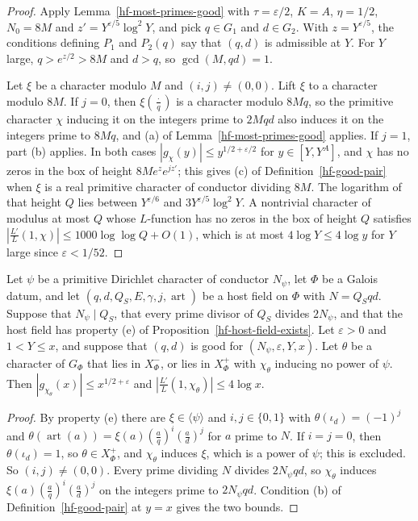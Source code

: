 \begin{proof}
Apply Lemma~\ref{hf-most-primes-good} with $\tau=\varepsilon/2$, $K=A$, $\eta=1/2$, $N_0=8M$ and
$z'=Y^{\varepsilon/5}\log^2Y$, and pick $q\in G_1$ and $d\in G_2$. With $z=Y^{\varepsilon/5}$, the
conditions defining $P_1$ and $P_2(q)$ say that $(q,d)$ is admissible at $Y$. For $Y$ large,
$q>e^{z/2}>8M$ and $d>q$, so $\gcd(M,qd)=1$.

Let $\xi$ be a character modulo $M$ and $(i,j)\neq(0,0)$. Lift $\xi$ to a character modulo $8M$.
If $j=0$, then $\xi\left(\frac{\cdot}{q}\right)$ is a character modulo $8Mq$, so the primitive
character $\chi$ inducing it on the integers prime to $2Mqd$ also induces it on the integers prime to
$8Mq$, and (a) of Lemma~\ref{hf-most-primes-good} applies. If $j=1$, part (b) applies. In both cases
$|g_\chi(y)|\leq y^{1/2+\varepsilon/2}$ for $y\in[Y,Y^A]$, and $\chi$ has no zeros in the box of
height $8Me^{z}e^{jz'}$; this gives (c) of Definition~\ref{hf-good-pair} when $\xi$ is a real
primitive character of conductor dividing $8M$. The logarithm of that height $Q$ lies between
$Y^{\varepsilon/6}$ and $3Y^{\varepsilon/5}\log^2Y$. A nontrivial character of modulus at most $Q$
whose $L$-function has no zeros in the box of height $Q$ satisfies
$\left|\frac{L'}{L}(1,\chi)\right|\leq1000\log\log Q+O(1)$, which is at most $4\log Y\leq4\log y$
for $Y$ large since $\varepsilon<1/52$.
\end{proof}

\begin{lemma}\label{hf-bounded-characters}
Let $\psi$ be a primitive Dirichlet character of conductor $N_\psi$, let $\Phi$ be a Galois datum, and let
$(q,d,Q_S,E,\gamma,j,\operatorname{art})$ be a host field on $\Phi$ with $N=Q_Sqd$. Suppose that
$N_\psi\mid Q_S$, that every prime divisor of $Q_S$ divides $2N_\psi$, and that the host field has
property (e) of Proposition~\ref{hf-host-field-exists}. Let $\varepsilon>0$ and $1<Y\leq x$, and
suppose that $(q,d)$ is good for $(N_\psi,\varepsilon,Y,x)$. Let $\theta$ be a character of $G_\Phi$
that lies in $X^-_\Phi$, or lies in $X^+_\Phi$ with $\chi_\theta$ inducing no power of $\psi$. Then
$|g_{\chi_\theta}(x)|\leq x^{1/2+\varepsilon}$ and $\left|\frac{L'}{L}(1,\chi_\theta)\right|\leq
4\log x$.
\end{lemma}

\begin{proof}
By property (e) there are $\xi\in\langle\psi\rangle$ and $i,j\in\{0,1\}$ with
$\theta(\iota_d)=(-1)^j$ and $\theta(\operatorname{art}(a))=\xi(a)\left(\frac aq\right)^i
\left(\frac ad\right)^j$ for $a$ prime to $N$. If $i=j=0$, then $\theta(\iota_d)=1$, so
$\theta\in X^+_\Phi$, and $\chi_\theta$ induces $\xi$, which is a power of $\psi$; this is excluded.
So $(i,j)\neq(0,0)$. Every prime dividing $N$ divides $2N_\psi qd$, so $\chi_\theta$ induces
$\xi(a)\left(\frac aq\right)^i\left(\frac ad\right)^j$ on the integers prime to $2N_\psi qd$.
Condition (b) of Definition~\ref{hf-good-pair} at $y=x$ gives the two bounds.
\end{proof}

